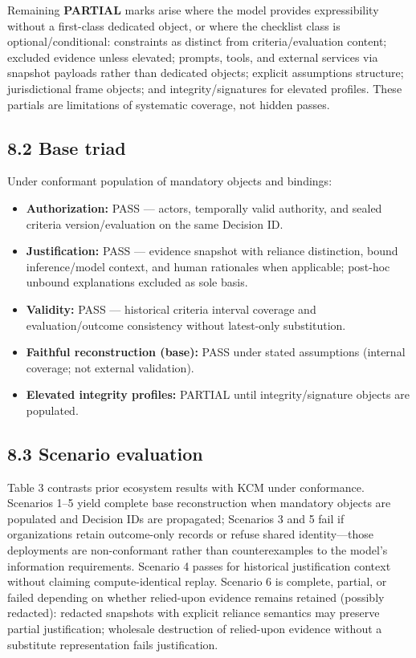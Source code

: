 \documentclass[11pt,a4paper]{article}
\begin{document}
Remaining \textbf{PARTIAL} marks arise where the model provides expressibility without a first-class dedicated object, or where the checklist class is optional/conditional: constraints as distinct from criteria/evaluation content; excluded evidence unless elevated; prompts, tools, and external services via snapshot payloads rather than dedicated objects; explicit assumptions structure; jurisdictional frame objects; and integrity/signatures for elevated profiles. These partials are limitations of systematic coverage, not hidden passes.


\subsection{8.2 Base triad}

Under conformant population of mandatory objects and bindings:


\begin{itemize}
\item \textbf{Authorization:} PASS --- actors, temporally valid authority, and sealed criteria version/evaluation on the same Decision ID.
\item \textbf{Justification:} PASS --- evidence snapshot with reliance distinction, bound inference/model context, and human rationales when applicable; post-hoc unbound explanations excluded as sole basis.
\item \textbf{Validity:} PASS --- historical criteria interval coverage and evaluation/outcome consistency without latest-only substitution.
\item \textbf{Faithful reconstruction (base):} PASS under stated assumptions (internal coverage; not external validation).
\item \textbf{Elevated integrity profiles:} PARTIAL until integrity/signature objects are populated.
\end{itemize}

\subsection{8.3 Scenario evaluation}

Table 3 contrasts prior ecosystem results with KCM under conformance. Scenarios 1--5 yield complete base reconstruction when mandatory objects are populated and Decision IDs are propagated; Scenarios 3 and 5 fail if organizations retain outcome-only records or refuse shared identity---those deployments are non-conformant rather than counterexamples to the model's information requirements. Scenario 4 passes for historical justification context without claiming compute-identical replay. Scenario 6 is complete, partial, or failed depending on whether relied-upon evidence remains retained (possibly redacted): redacted snapshots with explicit reliance semantics may preserve partial justification; wholesale destruction of relied-upon evidence without a substitute representation fails justification.
\end{document}
